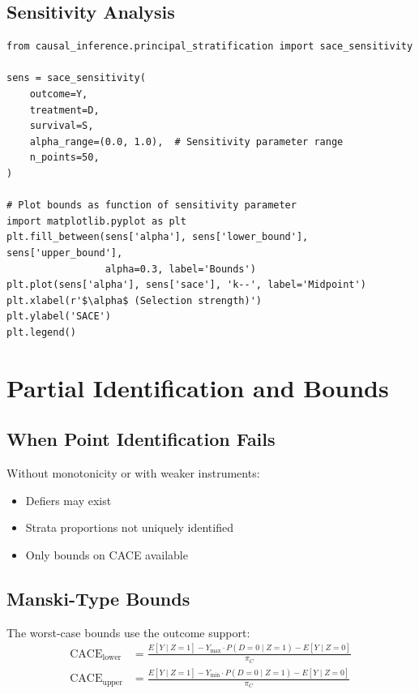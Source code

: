 \subsection{Sensitivity Analysis}

\begin{verbatim}
from causal_inference.principal_stratification import sace_sensitivity

sens = sace_sensitivity(
    outcome=Y,
    treatment=D,
    survival=S,
    alpha_range=(0.0, 1.0),  # Sensitivity parameter range
    n_points=50,
)

# Plot bounds as function of sensitivity parameter
import matplotlib.pyplot as plt
plt.fill_between(sens['alpha'], sens['lower_bound'], sens['upper_bound'],
                 alpha=0.3, label='Bounds')
plt.plot(sens['alpha'], sens['sace'], 'k--', label='Midpoint')
plt.xlabel(r'$\alpha$ (Selection strength)')
plt.ylabel('SACE')
plt.legend()
\end{verbatim}


\section{Partial Identification and Bounds}

\subsection{When Point Identification Fails}

Without monotonicity or with weaker instruments:
\begin{itemize}
\item Defiers may exist
\item Strata proportions not uniquely identified
\item Only bounds on CACE available
\end{itemize}

\subsection{Manski-Type Bounds}

The worst-case bounds use the outcome support:
\begin{align}
\text{CACE}_{\text{lower}} &= \frac{E[Y \mid Z = 1] - Y_{\max} \cdot P(D = 0 \mid Z = 1) - E[Y \mid Z = 0]}{\pi_C} \\
\text{CACE}_{\text{upper}} &= \frac{E[Y \mid Z = 1] - Y_{\min} \cdot P(D = 0 \mid Z = 1) - E[Y \mid Z = 0]}{\pi_C}
\end{align}


